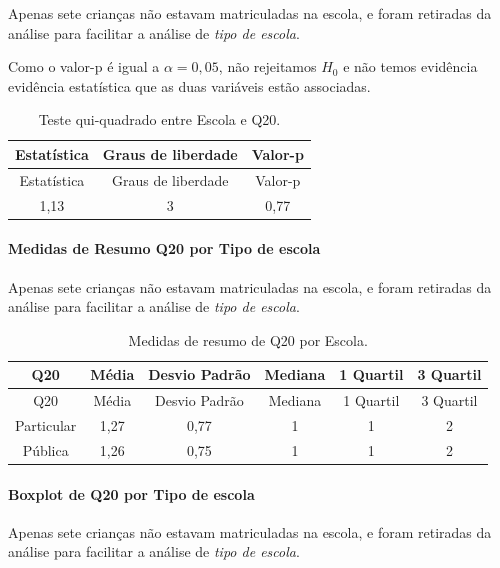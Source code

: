 \documentclass[]{article}
\let\oldparagraph\paragraph
\renewcommand{\paragraph}[1]{\oldparagraph{#1}\mbox{}}
\begin{document}
Apenas sete crianças não estavam matriculadas na escola, e foram retiradas da análise para facilitar a análise de \emph{tipo de escola}.

Como o valor-p é igual a \(\alpha=0,05\), não rejeitamos \(H_0\) e não temos evidência evidência estatística que as duas variáveis estão associadas.

\begin{longtable}[]{@{}ccc@{}}
\caption{\label{tab:unnamed-chunk-318}Teste qui-quadrado entre Escola e Q20.}\tabularnewline
\toprule
Estatística & Graus de liberdade & Valor-p\tabularnewline
\midrule
\endfirsthead
\toprule
Estatística & Graus de liberdade & Valor-p\tabularnewline
\midrule
\endhead
1,13 & 3 & 0,77\tabularnewline
\bottomrule
\end{longtable}

\cleardoublepage

\hypertarget{medidas-de-resumo-q20-por-tipo-de-escola}{%
\paragraph{Medidas de Resumo Q20 por Tipo de escola}\label{medidas-de-resumo-q20-por-tipo-de-escola}}

Apenas sete crianças não estavam matriculadas na escola, e foram retiradas da análise para facilitar a análise de \emph{tipo de escola}.

\begin{longtable}[]{@{}cccccc@{}}
\caption{\label{tab:unnamed-chunk-319}Medidas de resumo de Q20 por Escola.}\tabularnewline
\toprule
Q20 & Média & Desvio Padrão & Mediana & 1 Quartil & 3 Quartil\tabularnewline
\midrule
\endfirsthead
\toprule
Q20 & Média & Desvio Padrão & Mediana & 1 Quartil & 3 Quartil\tabularnewline
\midrule
\endhead
Particular & 1,27 & 0,77 & 1 & 1 & 2\tabularnewline
Pública & 1,26 & 0,75 & 1 & 1 & 2\tabularnewline
\bottomrule
\end{longtable}

\hypertarget{boxplot-de-q20-por-tipo-de-escola}{%
\paragraph{Boxplot de Q20 por Tipo de escola}\label{boxplot-de-q20-por-tipo-de-escola}}

Apenas sete crianças não estavam matriculadas na escola, e foram retiradas da análise para facilitar a análise de \emph{tipo de escola}.
\end{document}
